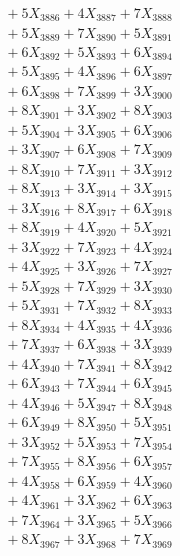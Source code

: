 \documentclass[a4paper,10pt]{article}
\begin{document}
{\begin{align}
&\;  + 5 X_{3886} + 4 X_{3887} + 7 X_{3888} \\[0.3ex]
&\;  + 5 X_{3889} + 7 X_{3890} + 5 X_{3891} \\[0.3ex]
&\;  + 6 X_{3892} + 5 X_{3893} + 6 X_{3894} \\[0.3ex]
&\;  + 5 X_{3895} + 4 X_{3896} + 6 X_{3897} \\[0.3ex]
&\;  + 6 X_{3898} + 7 X_{3899} + 3 X_{3900} \\[0.3ex]
&\;  + 8 X_{3901} + 3 X_{3902} + 8 X_{3903} \\[0.3ex]
&\;  + 5 X_{3904} + 3 X_{3905} + 6 X_{3906} \\[0.3ex]
&\;  + 3 X_{3907} + 6 X_{3908} + 7 X_{3909} \\[0.5ex]\allowbreak
&\;  + 8 X_{3910} + 7 X_{3911} + 3 X_{3912} \\[0.3ex]
&\;  + 8 X_{3913} + 3 X_{3914} + 3 X_{3915} \\[0.3ex]
&\;  + 3 X_{3916} + 8 X_{3917} + 6 X_{3918} \\[0.3ex]
&\;  + 8 X_{3919} + 4 X_{3920} + 5 X_{3921} \\[0.3ex]
&\;  + 3 X_{3922} + 7 X_{3923} + 4 X_{3924} \\[0.3ex]
&\;  + 4 X_{3925} + 3 X_{3926} + 7 X_{3927} \\[0.3ex]
&\;  + 5 X_{3928} + 7 X_{3929} + 3 X_{3930} \\[0.3ex]
&\;  + 5 X_{3931} + 7 X_{3932} + 8 X_{3933} \\[0.3ex]
&\;  + 8 X_{3934} + 4 X_{3935} + 4 X_{3936} \\[0.3ex]
&\;  + 7 X_{3937} + 6 X_{3938} + 3 X_{3939} \\[0.5ex]\allowbreak
&\;  + 4 X_{3940} + 7 X_{3941} + 8 X_{3942} \\[0.3ex]
&\;  + 6 X_{3943} + 7 X_{3944} + 6 X_{3945} \\[0.3ex]
&\;  + 4 X_{3946} + 5 X_{3947} + 8 X_{3948} \\[0.3ex]
&\;  + 6 X_{3949} + 8 X_{3950} + 5 X_{3951} \\[0.3ex]
&\;  + 3 X_{3952} + 5 X_{3953} + 7 X_{3954} \\[0.3ex]
&\;  + 7 X_{3955} + 8 X_{3956} + 6 X_{3957} \\[0.3ex]
&\;  + 4 X_{3958} + 6 X_{3959} + 4 X_{3960} \\[0.3ex]
&\;  + 4 X_{3961} + 3 X_{3962} + 6 X_{3963} \\[0.3ex]
&\;  + 7 X_{3964} + 3 X_{3965} + 5 X_{3966} \\[0.3ex]
&\;  + 8 X_{3967} + 3 X_{3968} + 7 X_{3969} \\[0.5ex]\allowbreak

\end{align}}
\end{document}
